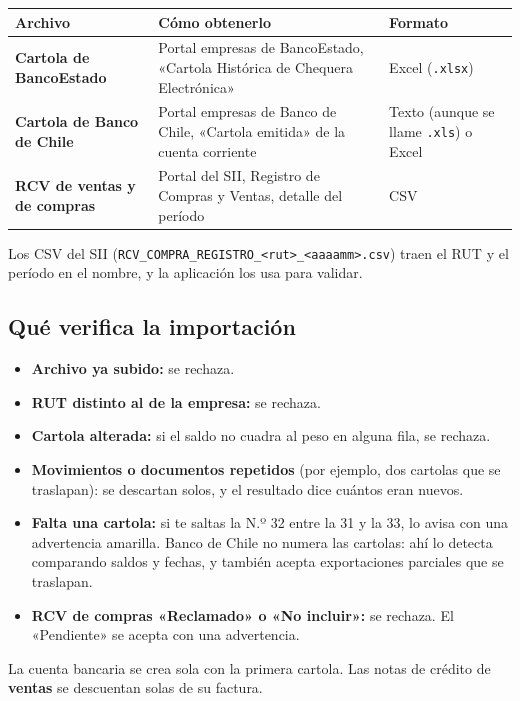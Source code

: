 \documentclass[11pt,a4paper]{article}
\newcommand{\cod}[1]{\texttt{#1}}
\newcommand{\encabezado}[1]{\sffamily\bfseries #1}
\begin{document}
\begin{tabularx}{\textwidth}{@{}>{\sffamily\bfseries}p{3.3cm}Y p{2.6cm}@{}}
\toprule
{}\encabezado{Archivo} & \encabezado{Cómo obtenerlo} & \encabezado{Formato}\\
\midrule
Cartola de BancoEstado & Portal empresas de BancoEstado, «Cartola Histórica de Chequera Electrónica» & Excel (\cod{.xlsx})\\
Cartola de Banco de Chile & Portal empresas de Banco de Chile, «Cartola emitida» de la cuenta corriente & Texto (aunque se llame \cod{.xls}) o Excel\\
RCV de ventas y de compras & Portal del SII, Registro de Compras y Ventas, detalle del período & CSV\\
\bottomrule
\end{tabularx}

\begin{aviso}
Los CSV del SII (\cod{RCV\_COMPRA\_REGISTRO\_<rut>\_<aaaamm>.csv}) traen el RUT y el período en el nombre, y la aplicación los usa para validar.
\end{aviso}

\subsection*{Qué verifica la importación}
\begin{itemize}
\item \textbf{Archivo ya subido:} se rechaza.
\item \textbf{RUT distinto al de la empresa:} se rechaza.
\item \textbf{Cartola alterada:} si el saldo no cuadra al peso en alguna fila, se rechaza.
\item \textbf{Movimientos o documentos repetidos} (por ejemplo, dos cartolas que se traslapan): se descartan solos, y el resultado dice cuántos eran nuevos.
\item \textbf{Falta una cartola:} si te saltas la N.º 32 entre la 31 y la 33, lo avisa con una advertencia amarilla. Banco de Chile no numera las cartolas: ahí lo detecta comparando saldos y fechas, y también acepta exportaciones parciales que se traslapan.
\item \textbf{RCV de compras «Reclamado» o «No incluir»:} se rechaza. El «Pendiente» se acepta con una advertencia.
\end{itemize}

La cuenta bancaria se crea sola con la primera cartola. Las notas de crédito de \textbf{ventas} se descuentan solas de su factura.
\end{document}

